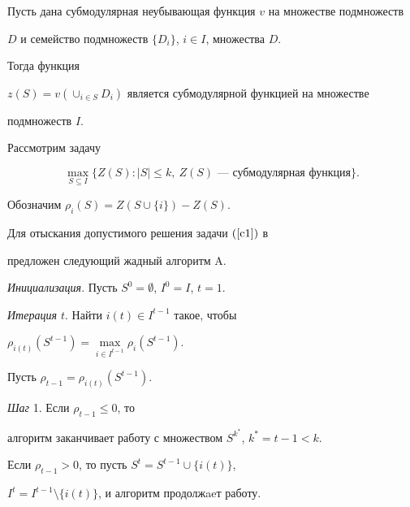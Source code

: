 \begin{lem} 


\label{c4}


Пусть дана субмодулярная неубывающая функция $v$ на множестве подмножеств 


$D$ и семейство подмножеств $\{ D_i \}$, $i \in I$, множества $D$.


Тогда функция 


$z(S) = v( \cup_{i \in S} D_i)$ является субмодулярной функцией на множестве 


подмножеств $I$.


\end{lem}





Рассмотрим задачу


\begin{equation}


\label{c1}


\max_{S \subseteq I} \{Z(S) : |S| \le k,


\ Z(S) \text{ --- субмодулярная функция} \}.


\end{equation}





Обозначим $\rho_i(S)= Z(S \cup \{ i \}) - Z(S)$.


Для отыскания допустимого решения задачи $(\ref{c1})$ в


\cite{NWF78} предложен следующий жадный алгоритм A.





{\it Инициализация}. Пусть $S^0= \emptyset$, $I^0=I$, $t=1$.





{\it Итерация $t$}. Найти $i(t) \in I^{t-1}$ такое, чтобы 


$\rho_{i(t)}(S^{t-1})= \max\limits_{i \in I^{t-1}} \rho_i(S^{t-1})$.


Пусть $\rho_{t-1}= \rho_{i(t)}(S^{t-1})$.





{\it Шаг} 1. Если $\rho_{t-1} \le 0$, то 


алгоритм заканчивает работу с множеством $S^{k^*}$, $k^*=t-1 < k$.


Если $\rho_{t-1} > 0$, то пусть $S^t=S^{t-1} \cup \{ i(t)\}$,


$I^t= I^{t-1} \setminus \{i(t) \}$, и алгоритм продолжaeт работу.






